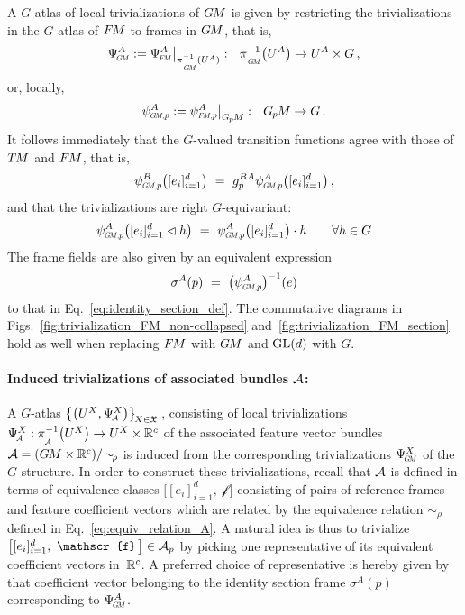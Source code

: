 A $G$-atlas of local trivializations of $G\mkern-1.4muM$ is given by restricting the trivializations in the $G$-atlas of $F\mkern-1.5muM$ to frames in $G\mkern-1.4muM$, that is,
\begin{align}
    \PsiGM^A := \PsiFM^A \big|_{\piGM^{-1}(U^A)} :\ \ \piGM^{-1} \big(U^A\big) \to U^A \times G \,,
\end{align}
or, locally,
\begin{align}
    \psiGMp^A := \psiFMp^A \big|_{\GpM} :\ \ \GpM \to G \,.
\end{align}
It follows immediately that the $G$-valued transition functions agree with those of $T\mkern-1.5muM$ and $F\mkern-1.5muM$, that is,
\begin{align}\label{eq:transition_functions_GM}
    \psiGMp^B\big([e_{i}]_{i=1}^d\big)
    \ =\ g_p^{BA} \psiGMp^A\big([e_{i}]_{i=1}^d \big) \,,
\end{align}
and that the trivializations are right $G$-equivariant:
\begin{align}\label{eq:right_equivariance_GM}
    \psiGMp^A\big([e_{i}]_{i=1}^d \lhd h\big)
    \ =\ \psiGMp^A\big( [e_{i}]_{i=1}^d \big) \cdot h \qquad \forall h \in G
\end{align}
The frame fields are also given by an equivalent expression
\begin{align}\label{eq:GM_section_psi_inverse_def}
    \sigma^A(p)\ =\ \big( \psiGMp^A \big)^{-1}(e)
\end{align}
to that in Eq.~\eqref{eq:identity_section_def}.
The commutative diagrams in Figs.~\ref{fig:trivialization_FM_non-collapsed} and~\ref{fig:trivialization_FM_section} hold as well when replacing $F\mkern-1.5muM$ with $G\mkern-1.4muM$ and $\operatorname{GL}(d)$ with $G$.











\paragraph{Induced trivializations of associated bundles $\mathcal{A}$:}

A $G$-atlas
$\big\{ \big(U^X, \PsiA^X \big) \big\}_{\!X\in\mathfrak{X}}\,$,
consisting of local trivializations
$\PsiA^X:\piA^{-1}\big(U^X\big)\to U^X\times\R^c$
of the associated feature vector bundles
$\mathcal{A}=(G\mkern-1.4muM\times\mathbb{R}^c)/\!\sim_{\!\rho}$
is induced from the corresponding trivializations $\PsiGM^X$ of the $G$-structure.
In order to construct these trivializations, recall that $\mathcal{A}$ is defined in terms of equivalence classes
$\big[ [e_{i}]_{i=1}^d,\ \mathscr{f}\,\big]$
consisting of pairs of reference frames and feature coefficient vectors which are related by the equivalence relation $\sim_{\!\rho}$ defined in Eq.~\eqref{eq:equiv_relation_A}.
A natural idea is thus to trivialize
$\big[ [e_{i}]_{i=1}^d,\ \mathscr{f}\,\big]\in\A_p$
by picking one representative of its equivalent coefficient vectors in~$\mathbb{R}^c$.
A preferred choice of representative is hereby given by that coefficient vector belonging to the identity section frame $\sigma^A(p)$ corresponding to $\PsiGM^A$.

